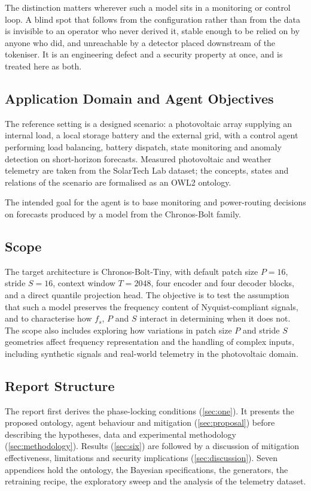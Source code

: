 The distinction matters wherever such a model sits in a monitoring or control loop. A blind spot that follows from the configuration rather than from the data is invisible to an operator who never derived it, stable enough to be relied on by anyone who did, and unreachable by a detector placed downstream of the tokeniser. It is an engineering defect and a security property at once, and is treated here as both.

\subsection*{Application Domain and Agent Objectives}
The reference setting is a designed scenario: a photovoltaic array supplying an internal load, a local storage battery and the external grid, with a control agent performing load balancing, battery dispatch, state monitoring and anomaly detection on short-horizon forecasts. Measured photovoltaic and weather telemetry are taken from the SolarTech Lab dataset\autocite{levaPhotovoltaicPowerWeather2020}; the concepts, states and relations of the scenario are formalised as an OWL2 ontology.

The intended goal for the agent is to base monitoring and power-routing decisions on forecasts produced by a model from the Chronos-Bolt family.

\subsection*{Scope}
The target architecture is Chronos-Bolt-Tiny, with default patch size $P=16$, stride $S=16$, context window $T=2048$, four encoder and four decoder blocks, and a direct quantile projection head\autocite{AmazonChronosbolttinyHugging2025,FastAccurateZeroshot2024a}. The objective is to test the assumption that such a model preserves the frequency content of Nyquist-compliant signals, and to characterise how $f_s$, $P$ and $S$ interact in determining when it does not. The scope also includes exploring how variations in patch size $P$ and stride $S$ geometries affect frequency representation and the handling of complex inputs, including synthetic signals and real-world telemetry in the photovoltaic domain.

\subsection*{Report Structure}
The report first derives the phase-locking conditions (\autoref{sec:one}). It presents the proposed ontology, agent behaviour and mitigation (\autoref{sec:proposal}) before describing the hypotheses, data and experimental methodology (\autoref{sec:methodology}). Results (\autoref{sec:six}) are followed by a discussion of mitigation effectiveness, limitations and security implications (\autoref{sec:discussion}). Seven appendices hold the ontology, the Bayesian specifications, the generators, the retraining recipe, the exploratory sweep and the analysis of the telemetry dataset.
